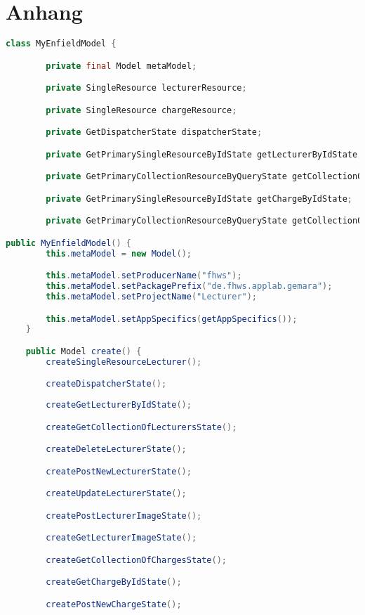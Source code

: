 \chapter{Anhang}

\newpage

\begin{lstlisting}[label=lst:enfield_model,
language=java,
firstnumber=1,
caption=Beschreibung des \textit{Enfield-Modell} der Referenzimplementierung. ]
class MyEnfieldModel {

		private final Model metaModel;

		private SingleResource lecturerResource;

		private SingleResource chargeResource;

		private GetDispatcherState dispatcherState;

		private GetPrimarySingleResourceByIdState getLecturerByIdState;

		private GetPrimaryCollectionResourceByQueryState getCollectionOfLecturersState;

		private GetPrimarySingleResourceByIdState getChargeByIdState;

		private GetPrimaryCollectionResourceByQueryState getCollectionOfChargesState;

public MyEnfieldModel() {
		this.metaModel = new Model();

		this.metaModel.setProducerName("fhws");
		this.metaModel.setPackagePrefix("de.fhws.applab.gemara");
		this.metaModel.setProjectName("Lecturer");

		this.metaModel.setAppSpecifics(getAppSpecifics());
	}

	public Model create() {
		createSingleResourceLecturer();

		createDispatcherState();
	
		createGetLecturerByIdState();

		createGetCollectionOfLecturersState();

		createDeleteLecturerState();

		createPostNewLecturerState();

		createUpdateLecturerState();

		createPostLecturerImageState();

		createGetLecturerImageState();

		createGetCollectionOfChargesState();

		createGetChargeByIdState();

		createPostNewChargeState();


\end{lstlisting}
